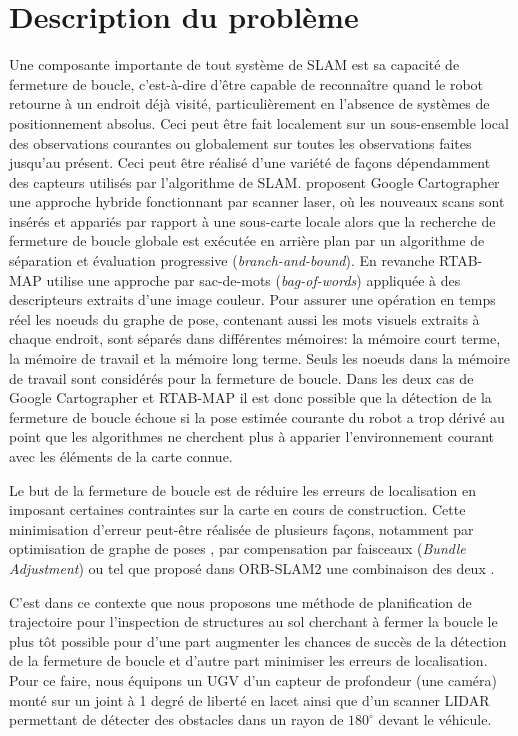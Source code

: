 \section{Description du problème} \label{sec:ugv_problem_description}
Une composante importante de tout système de SLAM est sa capacité de fermeture de boucle, c'est-à-dire d'être capable de reconnaître quand le robot retourne à un endroit déjà visité, particulièrement en l'absence de systèmes de positionnement absolus. Ceci peut être fait localement sur un sous-ensemble local des observations courantes ou globalement sur toutes les observations faites jusqu'au présent. Ceci peut être réalisé d'une variété de façons dépendamment des capteurs utilisés par l'algorithme de SLAM. \citep{Hess2016} proposent Google Cartographer une approche hybride fonctionnant par scanner laser, où les nouveaux scans sont insérés et appariés par rapport à une sous-carte locale alors que la recherche de fermeture de boucle globale est exécutée en arrière plan par un algorithme de séparation et évaluation progressive (\textit{branch-and-bound}). En revanche RTAB-MAP \citep{Labbe2014} utilise une approche par sac-de-mots (\textit{bag-of-words}) appliquée à des descripteurs extraits d'une image couleur. Pour assurer une opération en temps réel les noeuds du graphe de pose, contenant aussi les mots visuels extraits à chaque endroit, sont séparés dans différentes mémoires: la mémoire court terme, la mémoire de travail et la mémoire long terme. Seuls les noeuds dans la mémoire de travail sont considérés pour la fermeture de boucle. Dans les deux cas de Google Cartographer et RTAB-MAP il est donc possible que la détection de la fermeture de boucle échoue si la pose estimée courante du robot a trop dérivé au point que les algorithmes ne cherchent plus à apparier l'environnement courant avec les éléments de la carte connue.

Le but de la fermeture de boucle est de réduire les erreurs de localisation en imposant certaines contraintes sur la carte en cours de construction. Cette minimisation d'erreur peut-être réalisée de plusieurs façons, notamment par optimisation de graphe de poses \citep{Carlone2016}, par compensation par faisceaux (\textit{Bundle Adjustment}) \citep{Mei2011} ou tel que proposé dans ORB-SLAM2 une combinaison des deux \citep{Mur-Artal2017}.

C'est dans ce contexte que nous proposons une méthode de planification de trajectoire pour l'inspection de structures au sol cherchant à fermer la boucle le plus tôt possible pour d'une part augmenter les chances de succès de la détection de la fermeture de boucle et d'autre part minimiser les erreurs de localisation. Pour ce faire, nous équipons un UGV d'un capteur de profondeur (une caméra) monté sur un joint à 1 degré de liberté en lacet ainsi que d'un scanner LIDAR permettant de détecter des obstacles dans un rayon de $180^\circ$ devant le véhicule.


